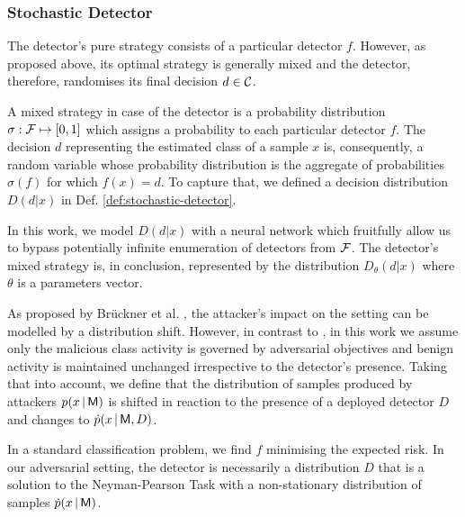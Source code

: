 \subsubsection{Stochastic Detector}
The detector's pure strategy consists of a particular detector $f$. However, as proposed above, its optimal strategy is generally mixed and the detector, therefore, randomises its final decision $d \in \mathcal{C}$.

A mixed strategy in case of the detector is a probability distribution $\sigma : \mathcal{F} \mapsto [0,1]$ which assigns a probability to each particular detector $f$. The decision $d$ representing the estimated class of a sample $x$ is, consequently, a random variable whose probability distribution is the aggregate of probabilities $\sigma(f)$ for which $f(x) = d$. To capture that, we defined a decision distribution $D(d|x)$ in Def. \ref{def:stochastic-detector}.

In this work, we model $D(d|x)$ with a neural network which fruitfully allow us to bypass potentially infinite enumeration of detectors from $\mathcal{F}$. The detector's mixed strategy is, in conclusion, represented by the distribution $D_\theta (d|x)$ where $\theta$ is a parameters vector.

As proposed by Brückner et al. \cite{stackelberg_games}, the attacker's impact on the setting can be modelled by a distribution shift. However, in contrast to \cite{stackelberg_games}, in this work we assume only the malicious class activity is governed by adversarial objectives and benign activity is maintained unchanged irrespective to the detector's presence. Taking that into account, we define that the distribution of samples produced by attackers $p(x \,|\, \mathsf{M})$ is shifted in reaction to the presence of a deployed detector $D$ and changes to $\dot{p}(x \,|\, \mathsf{M}, D)$.

In a standard classification problem, we find $f$ minimising the expected risk. In our adversarial setting, the detector is necessarily a distribution $D$ that is a solution to the Neyman-Pearson Task with a non-stationary distribution of samples $\dot{p}(x \,|\, \mathsf{M})$.

